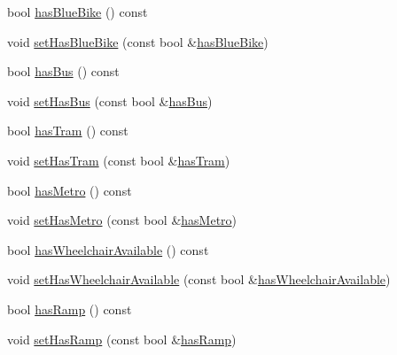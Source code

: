 \begin{DoxyCompactItemize}
\item 
bool \mbox{\hyperlink{classQRail_1_1StationEngine_1_1Station_a9c710a576b7834006ab714a3f298c6e6}{has\+Blue\+Bike}} () const
\item 
void \mbox{\hyperlink{classQRail_1_1StationEngine_1_1Station_a9a0738e9df95033eef7b88a1abb1e1cb}{set\+Has\+Blue\+Bike}} (const bool \&\mbox{\hyperlink{classQRail_1_1StationEngine_1_1Station_a9c710a576b7834006ab714a3f298c6e6}{has\+Blue\+Bike}})
\item 
bool \mbox{\hyperlink{classQRail_1_1StationEngine_1_1Station_ab373623fb7c16bd0e4de09a2c8ab3fed}{has\+Bus}} () const
\item 
void \mbox{\hyperlink{classQRail_1_1StationEngine_1_1Station_a21d3d32a85308ceecfa4588fab2d50d0}{set\+Has\+Bus}} (const bool \&\mbox{\hyperlink{classQRail_1_1StationEngine_1_1Station_ab373623fb7c16bd0e4de09a2c8ab3fed}{has\+Bus}})
\item 
bool \mbox{\hyperlink{classQRail_1_1StationEngine_1_1Station_a18cc82bbb307cdc0f1ef6db28a664fe5}{has\+Tram}} () const
\item 
void \mbox{\hyperlink{classQRail_1_1StationEngine_1_1Station_ac60188d8fd67689dbda07bd24391ea65}{set\+Has\+Tram}} (const bool \&\mbox{\hyperlink{classQRail_1_1StationEngine_1_1Station_a18cc82bbb307cdc0f1ef6db28a664fe5}{has\+Tram}})
\item 
bool \mbox{\hyperlink{classQRail_1_1StationEngine_1_1Station_ae3bfe0ae7f6c042e199c0d5a6e2dd669}{has\+Metro}} () const
\item 
void \mbox{\hyperlink{classQRail_1_1StationEngine_1_1Station_a108681c01bd97529f10fc19c40122910}{set\+Has\+Metro}} (const bool \&\mbox{\hyperlink{classQRail_1_1StationEngine_1_1Station_ae3bfe0ae7f6c042e199c0d5a6e2dd669}{has\+Metro}})
\item 
bool \mbox{\hyperlink{classQRail_1_1StationEngine_1_1Station_a5f199ba2479501715c96d41ce27bc4c8}{has\+Wheelchair\+Available}} () const
\item 
void \mbox{\hyperlink{classQRail_1_1StationEngine_1_1Station_a6cd5dbb113aedfd7fe6e46fdedb26e9b}{set\+Has\+Wheelchair\+Available}} (const bool \&\mbox{\hyperlink{classQRail_1_1StationEngine_1_1Station_a5f199ba2479501715c96d41ce27bc4c8}{has\+Wheelchair\+Available}})
\item 
bool \mbox{\hyperlink{classQRail_1_1StationEngine_1_1Station_a477fb013f192d1f7c0e6858008e42c0a}{has\+Ramp}} () const
\item 
void \mbox{\hyperlink{classQRail_1_1StationEngine_1_1Station_a4a5bd6731d4f53284f92f4eb0487944f}{set\+Has\+Ramp}} (const bool \&\mbox{\hyperlink{classQRail_1_1StationEngine_1_1Station_a477fb013f192d1f7c0e6858008e42c0a}{has\+Ramp}})

\end{DoxyCompactItemize}
